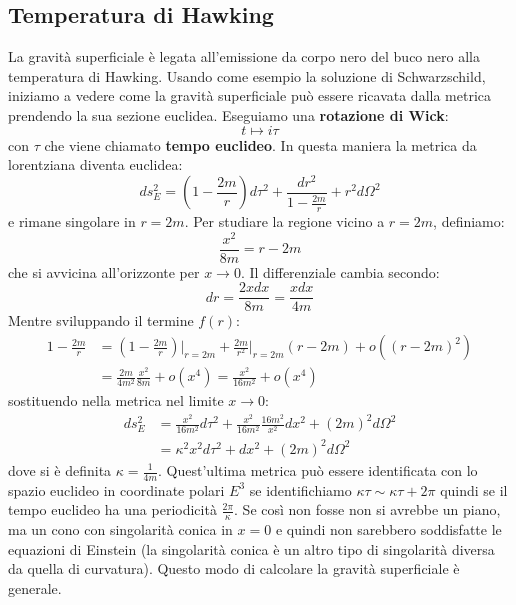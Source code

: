 \subsection{Temperatura di Hawking}
La gravità superficiale è legata all'emissione da corpo nero del buco nero alla temperatura di Hawking. 
Usando come esempio la soluzione di Schwarzschild, iniziamo a vedere come la gravità superficiale può essere ricavata dalla metrica prendendo la sua sezione euclidea.
Eseguiamo una \textbf{rotazione di Wick}:
\begin{equation*}
    t \mapsto i\tau
\end{equation*}
con $\tau$ che viene chiamato \textbf{tempo euclideo}. In questa maniera la metrica da lorentziana diventa euclidea:
\begin{equation}
    ds^2_E = \left( 1 - \frac{2m}{r}\right) d\tau^2 + \frac{dr^2}{1 - \frac{2m}{r}} + r^2d\Omega^2
    \label{eq.schwarzschild_euclidea}
\end{equation}
e rimane singolare in $r =2m$. Per studiare la regione vicino a $r=2m$, definiamo:
\begin{equation*}
    \frac{x^2}{8m} = r - 2m
\end{equation*}
che si avvicina all'orizzonte per $x \rightarrow 0$. Il differenziale cambia secondo:
\begin{equation*}
    dr = \frac{2xdx}{8m} = \frac{xdx}{4m}
\end{equation*}
Mentre sviluppando il termine $f(r)$:
\begin{align*}
    1 - \frac{2m}{r} &= \left( 1 - \frac{2m}{r}\right)\Big|_{r=2m} + \frac{2m}{r^2}\Big|_{r=2m}(r-2m) + o((r-2m)^2) \\
    &= \frac{2m}{4m^2}\frac{x^2}{8m} + o(x^4) = \frac{x^2}{16m^2} + o(x^4)
 \end{align*}
sostituendo nella metrica nel limite $x\rightarrow 0$:
\begin{align*}
    ds_E^2 &= \frac{x^2}{16m^2} d\tau^2 + \frac{x^2}{16m^2}\frac{16m^2}{x^2}dx^2 + (2m)^2 d\Omega^2 \\
    &= \kappa^2x^2 d\tau^2 + dx^2 + (2m)^2d\Omega^2
\end{align*}
dove si è definita $\kappa = \frac{1}{4m}$. Quest'ultima metrica può essere identificata con lo spazio euclideo in coordinate polari $E^3$ se identifichiamo $\kappa \tau \sim \kappa \tau + 2\pi$ quindi se il tempo euclideo ha una periodicità $\frac{2\pi}{\kappa}$.
Se così non fosse non si avrebbe un piano, ma un cono con singolarità conica in $x=0$ e quindi non sarebbero soddisfatte le equazioni di Einstein (la singolarità conica è un altro tipo di singolarità diversa da quella di curvatura). Questo modo di calcolare la gravità superficiale è generale.

